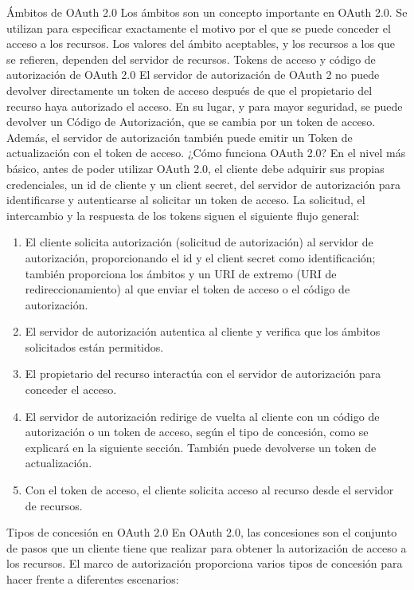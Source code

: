 \documentclass[12pt]{article}
\begin{document}
Ámbitos de OAuth 2.0
Los ámbitos son un concepto importante en OAuth 2.0. Se utilizan para especificar exactamente el motivo por el que se puede conceder el acceso a los recursos. Los valores del ámbito aceptables, y los recursos a los que se refieren, dependen del servidor de recursos.
Tokens de acceso y código de autorización de OAuth 2.0
El servidor de autorización de OAuth 2 no puede devolver directamente un token de acceso después de que el propietario del recurso haya autorizado el acceso. En su lugar, y para mayor seguridad, se puede devolver un Código de Autorización, que se cambia por un token de acceso. Además, el servidor de autorización también puede emitir un Token de actualización con el token de acceso. 
¿Cómo funciona OAuth 2.0?
En el nivel más básico, antes de poder utilizar OAuth 2.0, el cliente debe adquirir sus propias credenciales, un id de cliente y un client secret, del servidor de autorización para identificarse y autenticarse al solicitar un token de acceso.
La solicitud, el intercambio y la respuesta de los tokens siguen el siguiente flujo general:
\begin{enumerate}
\item El cliente solicita autorización (solicitud de autorización) al servidor de autorización, proporcionando el id y el client secret como identificación; también proporciona los ámbitos y un URI de extremo (URI de redireccionamiento) al que enviar el token de acceso o el código de autorización.
\item El servidor de autorización autentica al cliente y verifica que los ámbitos solicitados están permitidos.
\item El propietario del recurso interactúa con el servidor de autorización para conceder el acceso.
\item El servidor de autorización redirige de vuelta al cliente con un código de autorización o un token de acceso, según el tipo de concesión, como se explicará en la siguiente sección. También puede devolverse un token de actualización.
\item Con el token de acceso, el cliente solicita acceso al recurso desde el servidor de recursos.
\end{enumerate}
Tipos de concesión en OAuth 2.0
En OAuth 2.0, las concesiones son el conjunto de pasos que un cliente tiene que realizar para obtener la autorización de acceso a los recursos. El marco de autorización proporciona varios tipos de concesión para hacer frente a diferentes escenarios:
\end{document}
